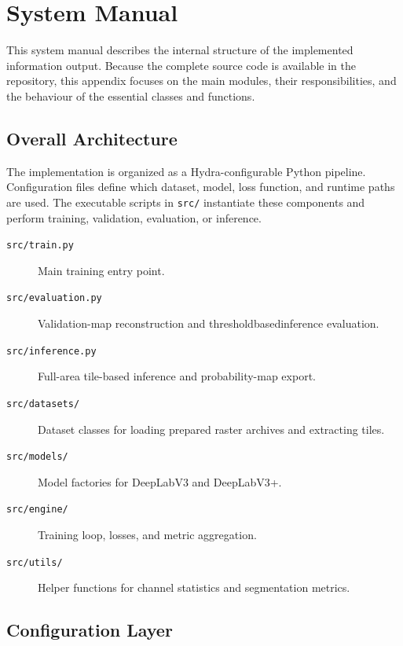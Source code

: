 
\chapter{System Manual}\label{app:system.manual}

\begin{sloppypar}

This system manual describes the internal structure of the implemented information output. Because the complete source code is available in the repository, this appendix focuses on the main modules, their responsibilities, and the behaviour of the essential classes and functions.

\section{Overall Architecture}

The implementation is organized as a Hydra-configurable Python pipeline. Configuration files define which dataset, model, loss function, and runtime paths are used. The executable scripts in \texttt{src/} instantiate these components and perform training, validation, evaluation, or inference.

\begin{description}
    \item[\texttt{src/train.py}] Main training entry point.
    \item[\texttt{src/evaluation.py}] Validation-map reconstruction and \gls{thresholdbasedinference} evaluation.
    \item[\texttt{src/inference.py}] Full-area tile-based inference and probability-map export.
    \item[\texttt{src/datasets/}] Dataset classes for loading prepared raster archives and extracting tiles.
    \item[\texttt{src/models/}] Model factories for DeepLabV3 and DeepLabV3+.
    \item[\texttt{src/engine/}] Training loop, losses, and metric aggregation.
    \item[\texttt{src/utils/}] Helper functions for channel statistics and segmentation metrics.
\end{description}

\section{Configuration Layer}


\end{sloppypar}
